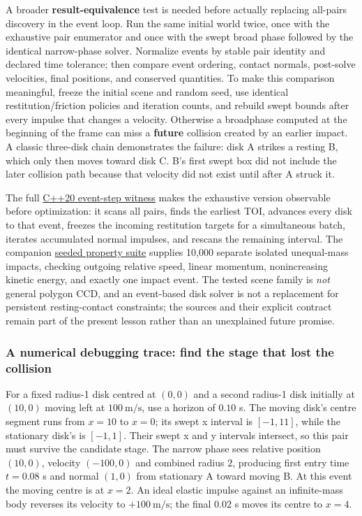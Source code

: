 A broader \textbf{result-equivalence} test is needed before actually replacing all-pairs discovery in the event loop. Run the same initial world twice, once with the exhaustive pair enumerator and once with the swept broad phase followed by the identical narrow-phase solver. Normalize events by stable pair identity and declared time tolerance; then compare event ordering, contact normals, post-solve velocities, final positions, and conserved quantities. To make this comparison meaningful, freeze the initial scene and random seed, use identical restitution/friction policies and iteration counts, and rebuild swept bounds after every impulse that changes a velocity. Otherwise a broadphase computed at the beginning of the frame can miss a \textbf{future} collision created by an earlier impact. A classic three-disk chain demonstrates the failure: disk A strikes a resting B, which only then moves toward disk C. B's first swept box did not include the later collision path because that velocity did not exist until after A struck it.

The full \href{../../tools/labs/disk_event_pipeline_lab.cpp}{C++20 event-step witness} makes the exhaustive version observable before optimization: it scans all pairs, finds the earliest TOI, advances every disk to that event, freezes the incoming restitution targets for a simultaneous batch, iterates accumulated normal impulses, and rescans the remaining interval. The companion \href{../../tools/labs/disk_event_property_lab.cpp}{seeded property suite} supplies 10,000 separate isolated unequal-mass impacts, checking outgoing relative speed, linear momentum, nonincreasing kinetic energy, and exactly one impact event. The tested scene family is \emph{not} general polygon CCD, and an event-based disk solver is not a replacement for persistent resting-contact constraints; the sources and their explicit contract remain part of the present lesson rather than an unexplained future promise.

\subsubsection{A numerical debugging trace: find the stage that lost the collision}\label{04-visual-computing-ii-ch026-a-numerical-debugging-trace-find-the-stage-that-lost-the-collision}

For a fixed radius-1 disk centred at \((0,0)\) and a second radius-1 disk initially at \((10,0)\) moving left at \(100\ \mathrm{m/s}\), use a horizon of \(0.10\) s. The moving disk's centre segment runs from \(x=10\) to \(x=0\); its swept x interval is \([-1,11]\), while the stationary disk's is \([-1,1]\). Their swept x and y intervals intersect, so this pair must survive the candidate stage. The narrow phase sees relative position \((10,0)\), velocity \((-100,0)\) and combined radius \(2\), producing first entry time \(t=0.08\) s and normal \((1,0)\) from stationary A toward moving B. At this event the moving centre is at \(x=2\). An ideal elastic impulse against an infinite-mass body reverses its velocity to \(+100\ \mathrm{m/s}\); the final \(0.02\) s moves its centre to \(x=4\).

